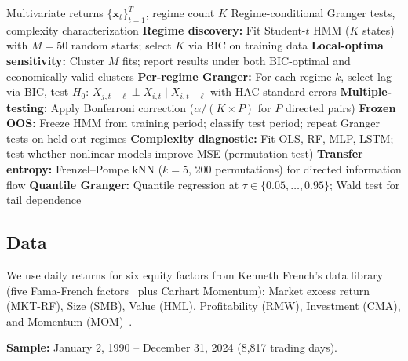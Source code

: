 \documentclass[sigconf,anonymous]{acmart}
\begin{document}
\begin{algorithm}[t]
\caption{Regime-Conditional Granger Diagnostic Protocol}
\label{alg:protocol}
\begin{algorithmic}[1]
\REQUIRE Multivariate returns $\{\mathbf{x}_t\}_{t=1}^T$, regime count $K$
\ENSURE Regime-conditional Granger tests, complexity characterization
\STATE \textbf{Regime discovery:} Fit Student-$t$ HMM ($K$ states) with $M = 50$ random starts; select $K$ via BIC on training data
\STATE \textbf{Local-optima sensitivity:} Cluster $M$ fits; report results under both BIC-optimal and economically valid clusters
\STATE \textbf{Per-regime Granger:} For each regime $k$, select lag via BIC, test $H_0$: $X_{j,t-\ell} \perp X_{i,t} \mid X_{i,t-\ell}$ with HAC standard errors
\STATE \textbf{Multiple-testing:} Apply Bonferroni correction ($\alpha / (K \times P)$ for $P$ directed pairs)
\STATE \textbf{Frozen OOS:} Freeze HMM from training period; classify test period; repeat Granger tests on held-out regimes
\STATE \textbf{Complexity diagnostic:} Fit OLS, RF, MLP, LSTM; test whether nonlinear models improve MSE (permutation test)
\STATE \textbf{Transfer entropy:} Frenzel--Pompe kNN ($k=5$, 200 permutations) for directed information flow
\STATE \textbf{Quantile Granger:} Quantile regression at $\tau \in \{0.05, \ldots, 0.95\}$; Wald test for tail dependence
\end{algorithmic}
\end{algorithm}

\subsection{Data}

We use daily returns for six equity factors from Kenneth French's data library~\cite{french2024data} (five Fama-French factors~\cite{fama2015five} plus Carhart Momentum):
Market excess return (MKT-RF), Size (SMB), Value (HML), Profitability (RMW),
Investment (CMA), and Momentum (MOM)~\cite{jegadeesh1993returns,carhart1997persistence}.

\textbf{Sample:} January 2, 1990 -- December 31, 2024 (8,817 trading days).
\end{document}
